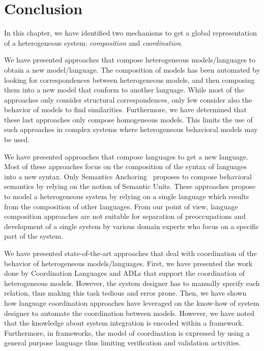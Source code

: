 \section{Conclusion}
In this chapter, we have identified two mechanisms to get a global representation of a heterogeneous system: \emph{composition} and \emph{coordination}. 

We have presented approaches that compose heterogeneous models/languages to obtain a new model/language. The composition of models has been automated by looking for correspondences between heterogeneous models, and then composing them into a new model that conform to another language. While most of the approaches only consider structural correspondences, only few consider also the behavior of models to find similarities. Furthermore, we have determined that these last approaches only compose homogeneous models. This limits the use of such approaches in complex systems where heterogeneous behavioral models may be used. 

We have presented approaches that compose languages to get a new language. Most of these approaches focus on the composition of the syntax of languages into a new syntax. Only Semantics Anchoring~\cite{semanticsanchoring} proposes to compose behavioral semantics by relying on the notion of Semantic Units. These approaches propose to model a heterogeneous system by relying on a single language which results from the composition of other languages. From our point of view, language composition approaches are not suitable for separation of preoccupations and development of a single system by various domain experts who focus on a specific part of the system.

We have presented state-of-the-art approaches that deal with coordination of the behavior of heterogeneous models/languages. First, we have presented the work done by Coordination Languages and ADLs that support the coordination of heterogeneous models. However, the system designer has to manually specify each relation, thus making this task tedious and error prone. Then, we have shown how language coordination approaches have leveraged on the know-how of system designer to automate the coordination between models. However, we have noted that the knowledge about system integration is encoded within a framework. Furthermore, in frameworks, the model of coordination is expressed by using a general purpose language thus limiting verification and validation activities. 

